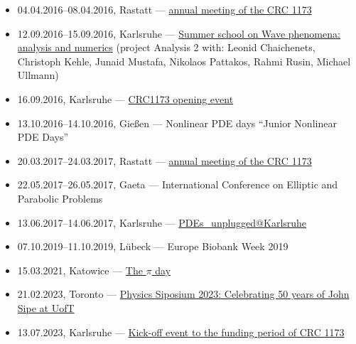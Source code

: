 \begin{itemize}
  \item 04.04.2016--08.04.2016, Rastatt --- \href{\urlFirstAnnualCrc}{ annual meeting of the CRC 1173}
  \item 12.09.2016--15.09.2016, Karlsruhe --- \href{https://www.waves.kit.edu/summerschool2016.php}{Summer school on Wave phenomena: analysis and numerics} (project Analysis 2 with: Leonid Chaichenets, Christoph Kehle, Junaid Mustafa, Nikolaos Pattakos, Rahmi Rusin, Michael Ullmann)
  \item 16.09.2016, Karlsruhe --- \href{https://www.waves.kit.edu/openingevent.php}{CRC1173 opening event}
  \item 13.10.2016--14.10.2016, Gießen --- Nonlinear PDE days ``Junior Nonlinear PDE Days''
  \item 20.03.2017--24.03.2017, Rastatt --- \href{\urlSecondAnnualCrc}{ annual meeting of the CRC 1173}
  \item 22.05.2017--26.05.2017, Gaeta --- International Conference on Elliptic and Parabolic Problems
  \item 13.06.2017--14.06.2017, Karlsruhe --- \href{https://www.math.kit.edu/iana2/event/pdeunplugrei_17/en}{PDEs\_unplugged@Karlsruhe}
  \item 07.10.2019--11.10.2019, Lübeck --- Europe Biobank Week 2019
  \item 15.03.2021, Katowice --- \href{\urlPiXV}{The $\pi$ day}
  \item 21.02.2023, Toronto --- \href{https://siposium2023.physics.utoronto.ca/}{Physics Siposium 2023: Celebrating 50 years of John Sipe at UofT}
  \item 13.07.2023, Karlsruhe --- \href{https://www.waves.kit.edu/kickoff3rdfundingperiod.php}{Kick-off event to the  funding period of CRC 1173}
\end{itemize}
